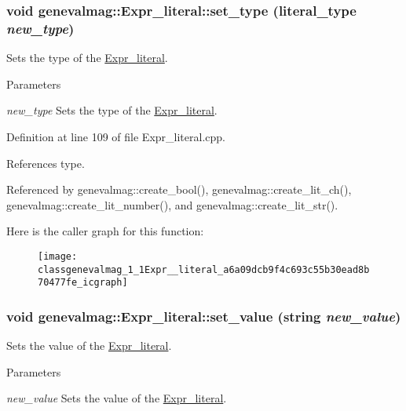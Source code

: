 \hypertarget{classgenevalmag_1_1Expr__literal_a6a09dcb9f4c693c55b30ead8b70477fe}{
\subsubsection[{set\_\-type}]{\setlength{\rightskip}{0pt plus 5cm}void genevalmag::Expr\_\-literal::set\_\-type ({\bf literal\_\-type} {\em new\_\-type})}}
\label{classgenevalmag_1_1Expr__literal_a6a09dcb9f4c693c55b30ead8b70477fe}
Sets the type of the \hyperlink{classgenevalmag_1_1Expr__literal}{Expr\_\-literal}. 
\begin{DoxyParams}{Parameters}
\item[{\em new\_\-type}]Sets the type of the \hyperlink{classgenevalmag_1_1Expr__literal}{Expr\_\-literal}. \end{DoxyParams}


Definition at line 109 of file Expr\_\-literal.cpp.



References type.



Referenced by genevalmag::create\_\-bool(), genevalmag::create\_\-lit\_\-ch(), genevalmag::create\_\-lit\_\-number(), and genevalmag::create\_\-lit\_\-str().



Here is the caller graph for this function:\nopagebreak
\begin{figure}[H]
\begin{center}
\leavevmode
\texttt{[image: classgenevalmag\_1\_1Expr\_\_literal\_a6a09dcb9f4c693c55b30ead8b70477fe\_icgraph]}
\end{center}
\end{figure}


\hypertarget{classgenevalmag_1_1Expr__literal_af5e0c53c8df7f902540387c4ff6912e7}{
\subsubsection[{set\_\-value}]{\setlength{\rightskip}{0pt plus 5cm}void genevalmag::Expr\_\-literal::set\_\-value (string {\em new\_\-value})}}
\label{classgenevalmag_1_1Expr__literal_af5e0c53c8df7f902540387c4ff6912e7}
Sets the value of the \hyperlink{classgenevalmag_1_1Expr__literal}{Expr\_\-literal}. 
\begin{DoxyParams}{Parameters}
\item[{\em new\_\-value}]Sets the value of the \hyperlink{classgenevalmag_1_1Expr__literal}{Expr\_\-literal}. \end{DoxyParams}


